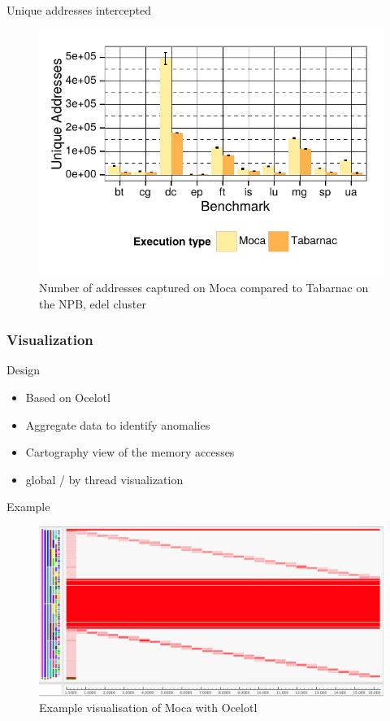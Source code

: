 \documentclass[xcolor={usenames,dvipsnames}]{beamer}
\begin{document}
\begin{frame}{Unique addresses intercepted}
    \begin{figure}[]
        \centering
        \includegraphics[width=.7\linewidth]{moca_addresses_nas.pdf}
        \caption{Number of addresses captured on Moca compared to Tabarnac on the NPB, edel
        cluster}
    \end{figure}
\end{frame}
\subsubsection*{Visualization}

\begin{frame}{Design}
    \begin{itemize}
        \item Based on Ocelotl~\cite{Dosimont14Trace}
        \item Aggregate data to identify anomalies
        \item Cartography view of the memory accesses
        \item global / by thread visualization
    \end{itemize}
\end{frame}

\begin{frame}{Example}
    \begin{figure}[]
        \centering
        \includegraphics[width=\linewidth]{ocelotl.png}
        \caption{Example visualisation of Moca with Ocelotl}
    \end{figure}
\end{frame}
\end{document}
